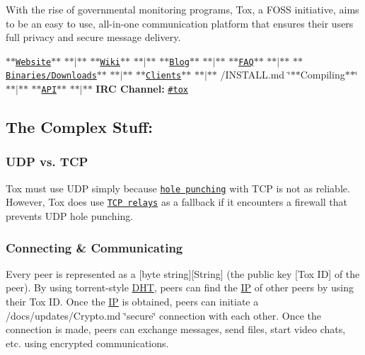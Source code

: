 



With the rise of governmental monitoring programs, Tox, a F\+O\+S\+S initiative, aims to be an easy to use, all-\/in-\/one communication platform that ensures their users full privacy and secure message delivery.~\newline
 ~\newline


\href{http://utox.org}{\tt $\ast$$\ast$\+Website$\ast$$\ast$} $\ast$$\ast$$\vert$$\ast$$\ast$ \href{https://wiki.tox.im/}{\tt $\ast$$\ast$\+Wiki$\ast$$\ast$} $\ast$$\ast$$\vert$$\ast$$\ast$ \href{https://blog.tox.im/}{\tt $\ast$$\ast$\+Blog$\ast$$\ast$} $\ast$$\ast$$\vert$$\ast$$\ast$ \href{https://wiki.tox.im/FAQ}{\tt $\ast$$\ast$\+F\+A\+Q$\ast$$\ast$} $\ast$$\ast$$\vert$$\ast$$\ast$ \href{https://wiki.tox.im/Binaries}{\tt $\ast$$\ast$\+Binaries/\+Downloads$\ast$$\ast$} $\ast$$\ast$$\vert$$\ast$$\ast$ \href{https://wiki.tox.im/Client}{\tt $\ast$$\ast$\+Clients$\ast$$\ast$} $\ast$$\ast$$\vert$$\ast$$\ast$ /\+I\+N\+S\+T\+A\+L\+L.md \char`\"{}$\ast$$\ast$\+Compiling$\ast$$\ast$\char`\"{} $\ast$$\ast$$\vert$$\ast$$\ast$ \href{https://libtoxcore.so/}{\tt $\ast$$\ast$\+A\+P\+I$\ast$$\ast$} $\ast$$\ast$$\vert$$\ast$$\ast$ {\bfseries I\+R\+C Channel\+:} \href{https://webchat.freenode.net/?channels=tox}{\tt \#tox}

\subsection*{The Complex Stuff\+:}

\subsubsection*{U\+D\+P vs. T\+C\+P}

Tox must use U\+D\+P simply because \href{https://en.wikipedia.org/wiki/UDP_hole_punching}{\tt hole punching} with T\+C\+P is not as reliable. However, Tox does use \href{/docs/TCP_Network.txt}{\tt T\+C\+P relays} as a fallback if it encounters a firewall that prevents U\+D\+P hole punching.

\subsubsection*{Connecting \& Communicating}

Every peer is represented as a \mbox{[}byte string\mbox{]}\mbox{[}String\mbox{]} (the public key \mbox{[}Tox I\+D\mbox{]} of the peer). By using torrent-\/style \hyperlink{struct_d_h_t}{D\+H\+T}, peers can find the \hyperlink{struct_i_p}{I\+P} of other peers by using their Tox I\+D. Once the \hyperlink{struct_i_p}{I\+P} is obtained, peers can initiate a /docs/updates/\+Crypto.md \char`\"{}secure\char`\"{} connection with each other. Once the connection is made, peers can exchange messages, send files, start video chats, etc. using encrypted communications.

